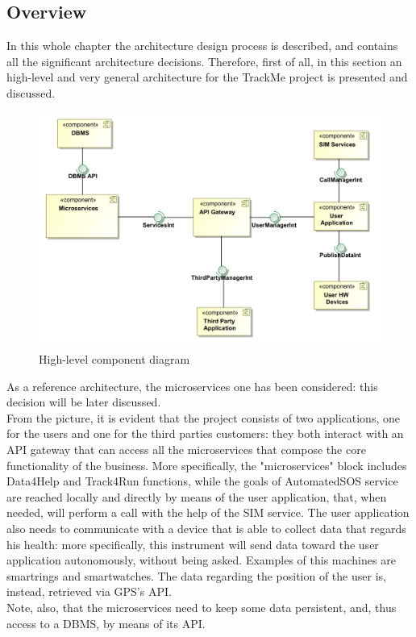 \subsection{Overview}
In this whole chapter the architecture design process is described, and contains all the significant
architecture decisions. 
Therefore, first of all, in this section an high-level and very general architecture for the TrackMe 
project is presented and discussed.  

\begin{figure}[H]
\includegraphics[width=\linewidth]{Images/highlevelcd.pdf}
\caption{ High-level component diagram }
\label{fig:world2}
\end{figure}

As a reference architecture, the microservices one has been considered: this decision will be later discussed. \\
From the picture, it is evident that the project consists of two applications, one for the users and one for the third parties customers: they both interact with an API gateway that can access all the
microservices that compose the core functionality of the business.
More specifically, the "microservices" block includes Data4Help and Track4Run functions, while the goals
of AutomatedSOS service are reached locally and directly by means of the user application, that, when
needed, will perform a call with the help of the SIM service. The user application also needs to
communicate with a device that is able to collect data that regards his health: more specifically, this
instrument will send data toward the user application autonomously, without being asked. Examples of 
this machines are smartrings and smartwatches. The data regarding the position of the user is, instead, retrieved via GPS's API. \\
Note, also, that the microservices need to keep some data persistent, and, thus access to a DBMS, by means
of its API. \\

